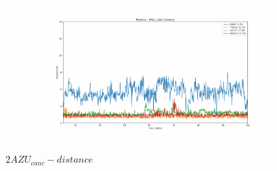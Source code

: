 \documentclass[fleqn,10pt]{wlscirep}
\begin{document}
\begin{figure}[!ht]
\begin{subfigure}{.45\textwidth}
  \end{subfigure}
    \begin{subfigure}{.45\textwidth}
     \centering
     \includegraphics[width=.95\linewidth]{2AZU_canc/2AZU_canc-dist_3.pdf}
  \end{subfigure}
\caption{$2AZU_{canc}-distance$}
\label{sup:2AZU_canc-dist}
\end{figure}  
\end{document}
